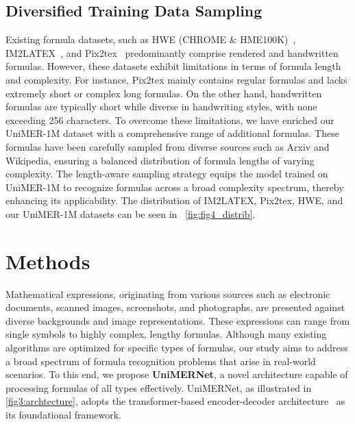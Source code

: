 \documentclass[runningheads]{llncs}
\begin{document}
\subsection{Diversified Training Data Sampling} 


Existing formula datasets, such as HWE (CHROME \& HME100K)~\cite{mouchere2014icfhr,mouchere2016icfhr2016,mahdavi2019icdar}, IM2LATEX~\cite{deng2017image}, and Pix2tex~\cite{pix2tex2022} predominantly comprise rendered and handwritten formulas. 
However, these datasets exhibit limitations in terms of formula length and complexity. For instance, Pix2tex mainly contains regular formulas and lacks extremely short or complex long formulas. 
On the other hand, handwritten formulas are typically short while diverse in handwriting styles, with none exceeding 256 characters.
To overcome these limitations, we have enriched our UniMER-1M dataset with a comprehensive range of additional formulas. These formulas have been carefully sampled from diverse sources such as Arxiv and Wikipedia, ensuring a balanced distribution of formula lengths of varying complexity. 
The length-aware sampling strategy equips the model trained on UniMER-1M to recognize formulas across a broad complexity spectrum, thereby enhancing its applicability.  The distribution of IM2LATEX, Pix2tex, HWE, and our UniMER-1M datasets can be seen in ~\cref{fig:fig4_distrib}.


\section{Methods}

Mathematical expressions, originating from various sources such as electronic documents, scanned images, screenshots, and photographs, are presented against diverse backgrounds and image representations. These expressions can range from single symbols to highly complex, lengthy formulas. Although many existing algorithms are optimized for specific types of formulas, our study aims to address a broad spectrum of formula recognition problems that arise in real-world scenarios. To this end, we propose \textbf{UniMERNet}, a novel architecture capable of processing formulas of all types effectively. UniMERNet, as illustrated in \cref{fig3:archtecture}, adopts the transformer-based encoder-decoder architecture~\cite{kim2022ocr} as its foundational framework.
\end{document}

